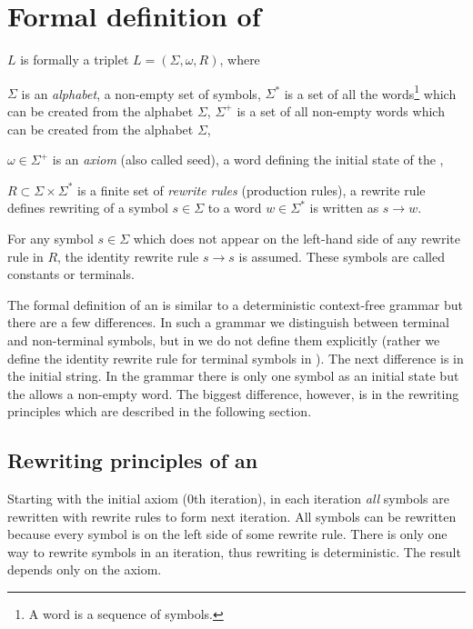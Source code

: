 
\section{Formal definition of \lsystem}

\lsystem $L$ is formally a triplet $L = (\Sigma, \omega, R)$, where

\begin{itemize*}
	\item $\Sigma$ is an \emph{alphabet}, a non-empty set of symbols, $\Sigma^{*}$ is a set of all the words\footnote{A word is a sequence of symbols.} which can be created from the alphabet $\Sigma$, $\Sigma^{+}$ is a set of all non-empty words which can be created from the alphabet $\Sigma$,
	\item $\omega \in \Sigma^{+}$ is an \emph{axiom} (also called seed), a word defining the initial state of the \lsystem,
	\item $R \subset \Sigma \times \Sigma^{*}$ is a finite set of \emph{rewrite rules} (production rules), a rewrite rule defines rewriting of a symbol $s \in \Sigma$ to a word $w \in \Sigma^{*}$ is written as $s \rightarrow w$.
\end{itemize*}

For any symbol $s \in \Sigma$ which does not appear on the left-hand side of any rewrite rule in $R$, the identity rewrite rule $s \rightarrow s$ is assumed.
These symbols are called constants or terminals.

The formal definition of an \lsystem is similar to a deterministic context-free grammar but there are a few differences.
In such a grammar we distinguish between terminal and non-terminal symbols, but in \lsystems we do not define them explicitly (rather we define the identity rewrite rule for terminal symbols in \lsystems).
The next difference is in the initial string.
In the grammar there is only one symbol as an initial state but the \lsystem allows a non-empty word.
The biggest difference, however, is in the rewriting principles which are described in the following section.


\subsection{Rewriting principles of an \lsystem}

Starting with the initial axiom (0th iteration), in each iteration \emph{all} symbols are rewritten with rewrite rules to form next iteration.
All symbols can be rewritten because every symbol is on the left side of some rewrite rule.
There is only one way to rewrite symbols in an iteration, thus rewriting is deterministic.
The result depends only on the axiom.

